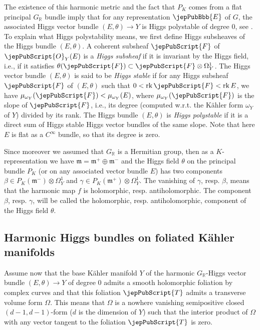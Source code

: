 The existence of this harmonic metric and the fact that $P_K$ comes from a flat principal $G_{\mathbb R}$ bundle imply that for any representation $\jepPubBbb{E}$ of $G$, the associated Higgs vector bundle $(E,\theta)\to Y$ is Higgs polystable of degree 0, see \cite{jep93Sim88}. To explain what Higgs polystability means, we first define Higgs subsheaves of the Higgs bundle $(E,\theta)$. A coherent subsheaf $\jepPubScript{F}$ of $\jepPubScript{O}_Y(E)$ is a \emph{Higgs subsheaf} if it is invariant by the Higgs field, i.e., if it satisfies $\theta(\jepPubScript{F})\subset\jepPubScript{F}\otimes\Omega_Y^1$. The Higgs vector bundle $(E,\theta)$ is said to be \emph{Higgs stable} if for any Higgs subsheaf $\jepPubScript{F}$ of $(E,\theta)$ such that $0<\operatorname{rk}\jepPubScript{F}<\operatorname{rk}E$, we have $\mu_{\omega_Y}(\jepPubScript{F})<\mu_{\omega_Y}(E)$, where $\mu_{\omega_Y}(\jepPubScript{F})$ is the slope of $\jepPubScript{F}$, i.e., its degree (computed w.r.t. the Kähler form $\omega_Y$ of $Y$) divided by its rank. The Higgs bundle $(E,\theta)$ is \emph{Higgs polystable} if it is a direct sum of Higgs stable Higgs vector bundles of the same slope. Note that here $E$ is flat as a $C^{\infty}$ bundle, so that its degree is zero.
\begin{remark}
Since moreover we assumed that $G_{\mathbb R}$ is a Hermitian group, then as a $K$-representation we have $\mathfrak m=\mathfrak m^+\oplus\mathfrak m^-$ and the Higgs field $\theta$ on the principal bundle $P_K$ (or on any associated vector bundle $E$) has two components $\beta\in P_K(\mathfrak m^-)\otimes\Omega_Y^1$ and $\gamma\in P_K(\mathfrak m^+)\otimes\Omega_Y^1$. The vanishing of $\gamma$, resp. $\beta$, means that the harmonic map $f$ is holomorphic, resp. antiholomorphic. The component $\beta$, resp. $\gamma$, will be called the holomorphic, resp. antiholomorphic, component of the Higgs field $\theta$.
\end{remark}
\subsection{Harmonic Higgs bundles on foliated Kähler manifolds}
Assume now that the base Kähler manifold $Y$ of the harmonic $G_{\mathbb R}$-Higgs vector bundle $(E,\theta)\to Y$ of degree $0$ admits a smooth holomorphic foliation by complex curves and that this foliation $\jepPubScript{T}$ admits a transverse volume form $\Omega$. This means that $\Omega$ is a nowhere vanishing semipositive closed $(d-1,d-1)$-form ($d$ is the dimension of $Y$) such that the interior product of $\Omega$ with any vector tangent to the foliation $\jepPubScript{T}$ is zero.

